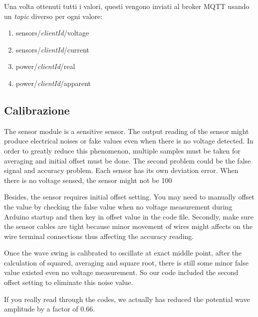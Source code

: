 \documentclass[italian,12pt,a4paper,oneside,final]{report}
\begin{document}
\newpage

Una volta ottenuti tutti i valori, questi vengono inviati al broker MQTT usando un \emph{topic} diverso per ogni valore:

\begin{enumerate}
  \item[]sensors/\textit{clientId}/voltage
  \item[] sensors/\textit{clientId}/current
  \item[] power/\textit{clientId}/real
  \item[] power/\textit{clientId}/apparent
\end{enumerate}

\subsection{Calibrazione}

The sensor module is a sensitive sensor. The output reading of the sensor might produce electrical noises or fake values even when there is no voltage detected. In order to greatly reduce this phenomenon, multiple samples must be taken for averaging and initial offset must be done.  
The second problem could be the false signal and accuracy problem. Each sensor has its own deviation error. When there is no voltage sensed, the sensor might not be 100%

Besides, the sensor requires initial offset setting. You may need to manually offset the value by checking the false value when no voltage measurement during Arduino startup and then key in offset value in the code file. Secondly, make sure the sensor cables are tight because minor movement of wires might affects on the wire terminal connections thus affecting the accuracy reading.

Once the wave swing is calibrated to oscillate at exact middle point, after the calculation of squared, averaging and square root, there is still some minor false value existed even no voltage measurement. So our code included the second offset setting to eliminate this noise value. 


If you really read through the codes, we actually has reduced the potential wave amplitude by a factor of 0.66. 
\end{document}
